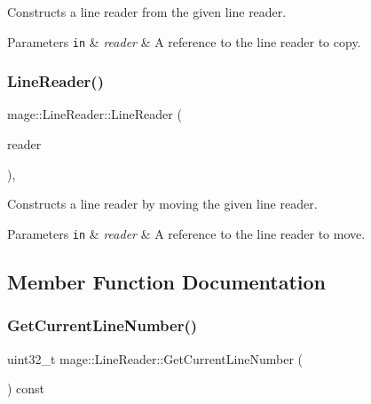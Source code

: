 Constructs a line reader from the given line reader.


\begin{DoxyParams}[1]{Parameters}
\mbox{\tt in}  & {\em reader} & A reference to the line reader to copy. \\
\hline
\end{DoxyParams}
\hypertarget{classmage_1_1_line_reader_ad972c7100f726e7b061d864083ba0225}{}\label{classmage_1_1_line_reader_ad972c7100f726e7b061d864083ba0225} 
\subsubsection{\texorpdfstring{Line\+Reader()}{LineReader()}\hspace{0.1cm}{\footnotesize\ttfamily [3/3]}}
{\footnotesize\ttfamily mage\+::\+Line\+Reader\+::\+Line\+Reader (\begin{DoxyParamCaption}\item[{\hyperlink{classmage_1_1_line_reader}{Line\+Reader} \&\&}]{reader }\end{DoxyParamCaption})\hspace{0.3cm}{\ttfamily [protected]}, {\ttfamily [default]}}

Constructs a line reader by moving the given line reader.


\begin{DoxyParams}[1]{Parameters}
\mbox{\tt in}  & {\em reader} & A reference to the line reader to move. \\
\hline
\end{DoxyParams}


\subsection{Member Function Documentation}
\hypertarget{classmage_1_1_line_reader_a55f35bf4989ad109524da146639870d6}{}\label{classmage_1_1_line_reader_a55f35bf4989ad109524da146639870d6} 
\subsubsection{\texorpdfstring{Get\+Current\+Line\+Number()}{GetCurrentLineNumber()}}
{\footnotesize\ttfamily uint32\+\_\+t mage\+::\+Line\+Reader\+::\+Get\+Current\+Line\+Number (\begin{DoxyParamCaption}{ }\end{DoxyParamCaption}) const\hspace{0.3cm}{\ttfamily [protected]}}

